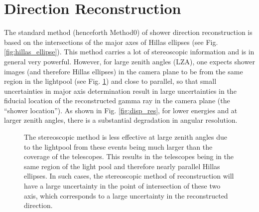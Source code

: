 \documentclass[main.tex]{subfiles}
\begin{document}
\section{Direction Reconstruction}
The standard method (henceforth Method0) of shower direction reconstruction is based on the intersections of the major axes of Hillas ellipses (see Fig. \ref{fig:hillas_ellipse}). This method carries a lot of stereoscopic information and is in general very powerful. However, for large zenith angles (LZA), one expects shower images (and therefore Hillas ellipses) in the camera plane to be from the same region in the lightpool (see Fig. \ref{fig:LZA_lightpool}) and close to parallel, so that small uncertainties in major axis determination result in large uncertainties in the fiducial location of the reconstructed gamma ray in the camera plane (the ``shower location''). As shown in Fig. \ref{fig:disp_res}, for lower energies and at larger zenith angles, there is a substantial degradation in angular resolution.

\begin{figure}[htbp]
  \centering
  \caption[Stereoscopic reconstruction at LZA.]{The stereoscopic method is less effective at large zenith angles due to the lightpool from these events being much larger than the coverage of the telescopes. This results in the telescopes being in the same region of the light pool and therefore nearly parallel Hillas ellipses. In such cases, the stereoscopic method of reconstruction will have a large uncertainty in the point of intersection of these two axis, which corresponds to a large uncertainty in the reconstructed direction.}
  \label{fig:LZA_lightpool}
\end{figure}
\end{document}
